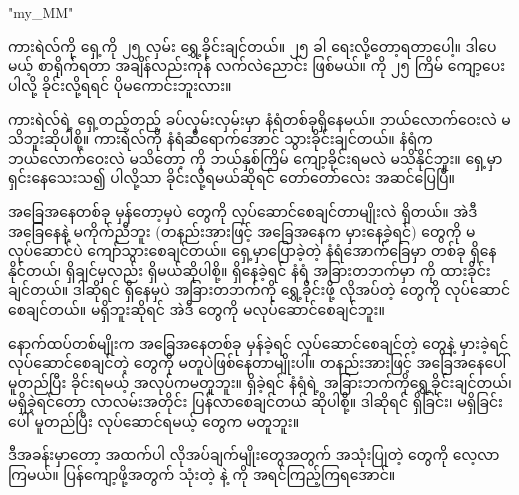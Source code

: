 \chapter{ }
\XeTeXlinebreaklocale "my_MM"  %
\begin{sloppypar}
ကားရဲလ်ကို ရှေ့ကို ၂၅ လှမ်း ရွှေ့ခိုင်းချင်တယ်။  ၂၅ ခါ ရေးလို့‌တော့ရတာပေါ့။ ဒါပေမယ့် စာရိုက်ရတာ အချိန်လည်းကုန် လက်လဲညောင်း ဖြစ်မယ်။ {} ကို ၂၅ ကြိမ် ကျော့ပေးပါလို့ ခိုင်းလို့ရရင် ပိုမကောင်းဘူးလား။ 

ကားရဲလ်ရဲ့ ရှေ့တည့်တည့် ခပ်လှမ်းလှမ်းမှာ နံရံတစ်ခုရှိနေမယ်။ ဘယ်လောက်ဝေးလဲ မသိဘူးဆိုပါစို့။ ကားရဲလ်ကို နံရံဆီရောက်အောင် သွားခိုင်းချင်တယ်။ နံရံက ဘယ်လောက်ဝေးလဲ မသိတော့ {} ကို ဘယ်နှစ်ကြိမ် ကျော့ခိုင်းရမလဲ မသိနိုင်ဘူး။ ရှေ့မှာရှင်းနေသေးသ၍  ပါလို့သာ ခိုင်းလို့ရမယ်ဆိုရင် တော်တော်လေး အဆင်ပြေပြီ။  

အခြေအနေတစ်ခု မှန်တော့မှပဲ \mmcommand တွေကို  လုပ်ဆောင်စေချင်တာမျိုးလဲ ရှိတယ်။ အဲဒီ အခြေနေနဲ့ မကိုက်ညီဘူး (တနည်းအားဖြင့် အခြေအနေက မှားနေခဲ့ရင်) \mmcommand တွေကို မလုပ်ဆောင်ပဲ ကျော်သွားစေချင်တယ်။ ရှေ့မှာပြောခဲ့တဲ့ နံရံအောက််ခြေမှာ \mmbeeper တစ်ခု ရှိနေနိုင်တယ်၊ ရှိချင်မှလည်း ရှိမယ်ဆိုပါစို့။ \mmbeeper ရှိနေခဲ့ရင် နံရံ အခြားတဘက်မှာ \mmbeeper ကို ထားခိုင်းချင်တယ်။  ဒါဆိုရင် \mmbeeper ရှိနေမှပဲ အခြားတဘက်ကို ရွှေ့ခိုင်းဖို့ လိုအပ်တဲ့ \mmcommand တွေကို လုပ်ဆောင်စေချင်တယ်။ \mmbeeper မရှိဘူးဆိုရင် အဲဒီ \mmcommand တွေကို မလုပ်ဆောင်စေချင်ဘူး။  

နောက်ထပ်တစ်မျိုးက အခြေအနေတစ်ခု မှန်ခဲ့ရင် လုပ်ဆောင်စေချင်တဲ့ \mmcommand တွေနဲ့ မှားခဲ့ရင်‌ လုပ်ဆောင်စေချင်တဲ့ \mmcommand ‌တွေကို မတူပဲဖြစ်နေတာမျိုးပါ။ တနည်းအားဖြင့် အခြေအနေပေါ် မူတည်ပြီး ခိုင်းရမယ့် အလုပ်ကမတူဘူး။ \mmbeeper ရှိခဲ့ရင် နံရံရဲ့ အခြားဘက်ကိုရွှေ့ခိုင်းချင်တယ်၊ မရှိခဲ့ရင်တော့ လာလမ်းအတိုင်း ပြန်လာစေချင်တယ် ဆိုပါစို့။ ဒါဆိုရင် \mmbeeper ရှိခြင်း၊ မရှိခြင်းပေါ် မူတည်ပြီး လုပ်ဆောင်ရမယ့် \mmcommand တွေက  မတူဘူး။ 

ဒီအခန်းမှာတော့ အထက်ပါ လိုအပ်ချက်မျိုးတွေအတွက် အသုံးပြုတဲ့ \enControlFlowStatements တွေကို လေ့လာကြမယ်။ ပြန်ကျော့ဖို့အတွက် သုံးတဲ့   နဲ့   ကို အရင်ကြည့်ကြရအောင်။


\end{sloppypar}
